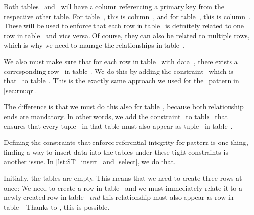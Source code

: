 Both tables~ and~ will have a column referencing a primary key from the respective other table.
For table~, this is column~, and for table~, this is column~.
These will be used to enforce that each row in table~ is definitely related to one row in table~ and vice versa.
Of course, they can also be related to multiple rows, which is why we need to manage the relationships in table~.%
%
\begin{sloppypar}%
We also must make sure that for each row in table~ with data~, there exists a corresponding row~ in table~.
We do this by adding the constraint~ which is~ that~ to table~.
This is the exactly same approach we used for the ~pattern in \cref{sec:rm:qr}.%
\end{sloppypar}%
%
The difference is that we must do this also for table~, because both relationship ends are mandatory.
In other words, we add the constraint~ to table~ that ensures that every tuple~ in that table must also appear as tuple~ in table~.

Defining the constraints that enforce referential integrity for pattern is one thing, finding a way to insert data into the tables under these tight constraints is another issue.
In \cref{lst:ST_insert_and_select}, we do that.

Initially, the tables are empty.
This means that we need to create three rows at once:
We need to create a row in table~ and we must immediately relate it to a newly created row in table~ \emph{and} this relationship must also appear as row in table~.
Thanks to , this is possible.

